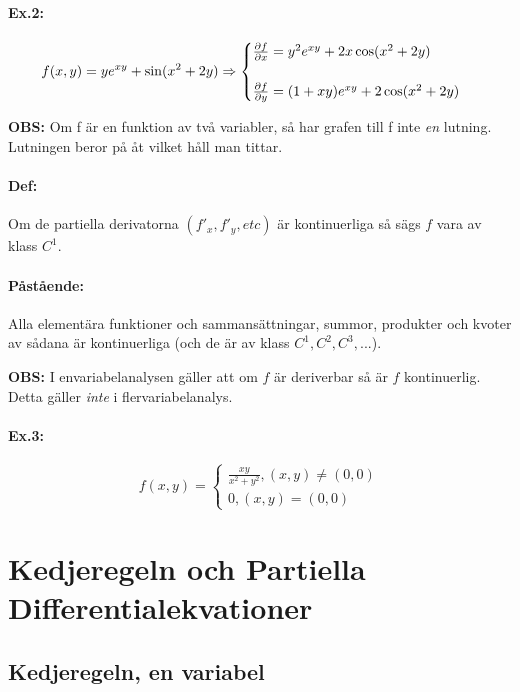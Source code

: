 \documentclass[a4paper,12pt]{article}
\newcommand{\partialfrac}[2]{\frac{\partial #1}{\partial #2}}
\begin{document}
\paragraph{Ex.2:}
  \begin{equation*}
    f(x,y)=ye^{xy}+\sin(x^2+2y) \Rightarrow
    \begin{cases}
      \partialfrac{f}{x} = y^2e^{xy}+2x\cos(x^2+2y) \\ \\
      \partialfrac{f}{y} = (1+xy)e^{xy}+2\cos(x^2+2y)
    \end{cases}\\
  \end{equation*}

\textbf{OBS:}
  Om f är en funktion av två variabler, så har grafen till f inte \textit{en}
  lutning. Lutningen beror på åt vilket håll man tittar.

\paragraph{Def:}
  Om de partiella derivatorna $(f'_x, f'_y, etc)$ är kontinuerliga så sägs $f$
  vara av klass $C^1$.

\paragraph{Påstående:}
  Alla elementära funktioner och sammansättningar, summor, produkter och kvoter
  av sådana är kontinuerliga (och de är av klass $C^1,C^2,C^3,...$).

\textbf{OBS:}
  I envariabelanalysen gäller att om $f$ är deriverbar så är $f$ kontinuerlig.
  Detta gäller \textit{inte} i flervariabelanalys.

\paragraph{Ex.3:}
  \begin{equation*}
    f(x,y) =
    \begin{cases}
      \frac{xy}{x^2+y^2}, (x,y)\neq(0,0) \\
      0, (x,y)=(0,0)
    \end{cases}
  \end{equation*}

\section{Kedjeregeln och Partiella Differentialekvationer}
\subsection{Kedjeregeln, en variabel}
\end{document}
